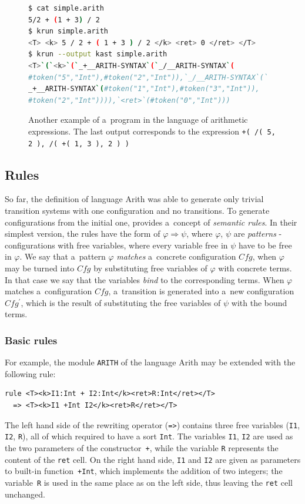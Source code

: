 \documentclass{fithesis3}
\newcommand{\var}[1]{\mathit{#1}\xspace}
\begin{document}
\begin{figure}
\begin{lstlisting}[language=bash]
$ cat simple.arith
5/2 + (1 + 3) / 2
$ krun simple.arith
<T> <k> 5 / 2 + ( 1 + 3 ) / 2 </k> <ret> 0 </ret> </T>
$ krun --output kast simple.arith
<T>`(`<k>`(`_+__ARITH-SYNTAX`(`_/__ARITH-SYNTAX`(
#token("5","Int"),#token("2","Int")),`_/__ARITH-SYNTAX`(`
_+__ARITH-SYNTAX`(#token("1","Int"),#token("3","Int")),
#token("2","Int")))),`<ret>`(#token("0","Int")))
\end{lstlisting}
\caption{Another example of a~program in the language of arithmetic expressions. The last output corresponds to the expression \lstinline{+( /( 5, 2 ), /( +( 1, 3 ), 2 ) )}{}}
\label{arithMixed}
\end{figure}

\subsection{Rules}
So far, the definition of language Arith was able to generate only trivial transition systems with one configuration and no transitions. To generate configurations from the initial one, \K provides a~concept of \textit{semantic rules}. In their simplest version, the rules have the form of $\varphi \Rightarrow \psi$, where $\varphi$, $\psi$ are \textit{patterns} - configurations with free variables, where every variable free in $\psi$ have to be free in $\varphi$. We say that a~pattern $\varphi$ \textit{matches} a~concrete configuration $\var{Cfg}$, when $\varphi$ may be turned into $\var{Cfg}$ by substituting free variables of $\varphi$ with concrete terms. In that case we say that the variables \textit{bind} to the corresponding terms. When $\varphi$ matches a~configuration $\var{Cfg}$, a~transition is generated into a~new configuration $\var{Cfg^\prime}$, which is the result of substituting the free variables of $\psi$ with the bound terms.

\subsubsection{Basic rules}
For example, the module \texttt{ARITH} of the language Arith may be extended with the following rule:
\begin{lstlisting}
rule <T><k>I1:Int + I2:Int</k><ret>R:Int</ret></T> 
  => <T><k>I1 +Int I2</k><ret>R</ret></T>
\end{lstlisting}
The left hand side of the rewriting operator (\lstinline{=>}{}) contains three free variables (\texttt{I1}, \texttt{I2}, \texttt{R}), all of which required to have a sort \texttt{Int}. The variables \texttt{I1}, \texttt{I2} are used as the two parameters of the constructor~\lstinline{+}{}, while the variable \texttt{R} represents the content of the \texttt{ret} cell. On the right hand side, \texttt{I1} and \texttt{I2} are given as parameters to built-in function~\lstinline{+Int}{}, which implements the addition of two integers; the variable~\texttt{R} is used in the same place as on the left side, thus leaving the \texttt{ret} cell unchanged.
\end{document}

